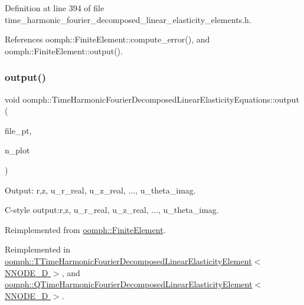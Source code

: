 Definition at line 394 of file time\+\_\+harmonic\+\_\+fourier\+\_\+decomposed\+\_\+linear\+\_\+elasticity\+\_\+elements.\+h.



References oomph\+::\+Finite\+Element\+::compute\+\_\+error(), and oomph\+::\+Finite\+Element\+::output().

\mbox{\label{classoomph_1_1TimeHarmonicFourierDecomposedLinearElasticityEquations_a50b96a6a3cba3791978eb49b5cfcba39}} 
\subsubsection{\texorpdfstring{output()}{output()}\hspace{0.1cm}{\footnotesize\ttfamily [4/4]}}
{\footnotesize\ttfamily void oomph\+::\+Time\+Harmonic\+Fourier\+Decomposed\+Linear\+Elasticity\+Equations\+::output (\begin{DoxyParamCaption}\item[{F\+I\+LE $\ast$}]{file\+\_\+pt,  }\item[{const unsigned \&}]{n\+\_\+plot }\end{DoxyParamCaption})\hspace{0.3cm}{\ttfamily [virtual]}}



Output\+: r,z, u\+\_\+r\+\_\+real, u\+\_\+z\+\_\+real, ..., u\+\_\+theta\+\_\+imag. 

C-\/style output\+:r,z, u\+\_\+r\+\_\+real, u\+\_\+z\+\_\+real, ..., u\+\_\+theta\+\_\+imag. 

Reimplemented from \hyperlink{classoomph_1_1FiniteElement_adfaee690bb0608f03320eeb9d110d48c}{oomph\+::\+Finite\+Element}.



Reimplemented in \hyperlink{classoomph_1_1TTimeHarmonicFourierDecomposedLinearElasticityElement_a05e2f49a9bd2941f4bbabd5f0279d86a}{oomph\+::\+T\+Time\+Harmonic\+Fourier\+Decomposed\+Linear\+Elasticity\+Element$<$ N\+N\+O\+D\+E\+\_\+D $>$}, and \hyperlink{classoomph_1_1QTimeHarmonicFourierDecomposedLinearElasticityElement_aa965a2e2d7f942f43e5e668b9111e9e0}{oomph\+::\+Q\+Time\+Harmonic\+Fourier\+Decomposed\+Linear\+Elasticity\+Element$<$ N\+N\+O\+D\+E\+\_\+D $>$}.



